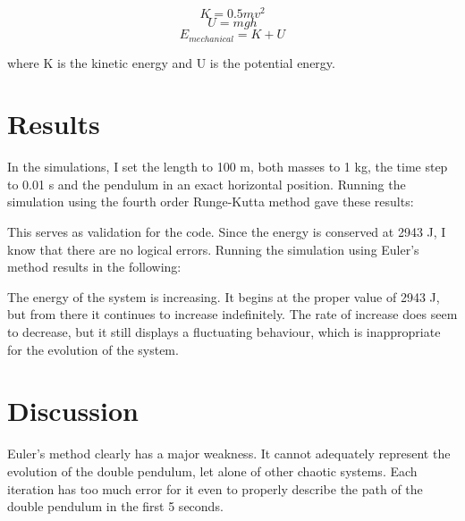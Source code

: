 \documentclass[a4paper,12pt]{article}
\begin{document}
\[ K = 0.5 m v^2 \]
\[ U = mgh \]
\[ E_{mechanical} = K + U \]

where K is the kinetic energy and U is the potential energy.

\section*{Results}

In the simulations, I set the length to 100 m, both masses to 1 kg, the time
step to 0.01 s and the pendulum in an exact horizontal position. Running
the simulation using the fourth order Runge-Kutta method gave these
results: \\


This serves as validation for the code. Since the energy is conserved at
2943 J, I know that there are no logical errors. Running the simulation
using Euler's method results in the following: \\


The energy of the system is increasing. It begins at the proper value of
2943 J, but from there it continues to increase indefinitely. The rate of
increase does seem to decrease, but it still displays a fluctuating
behaviour, which is inappropriate for the evolution of the system.

\section*{Discussion}
Euler's method clearly has a major weakness. It cannot adequately represent
the evolution of the double pendulum, let alone of other chaotic systems.
Each iteration has too much error for it even to properly describe the path
of the double pendulum in the first 5 seconds.
\end{document}
